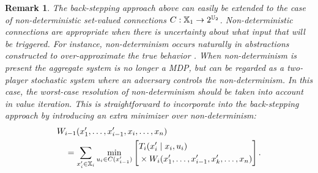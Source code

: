 \documentclass[draft,conference]{IEEEtran}
\newtheorem{remark}{Remark}
\begin{document}


\begin{remark}
	The back-stepping approach above can easily be extended to the case of \emph{non-deterministic} set-valued connections $C : \mathbb{X}_1 \rightarrow 2^{\mathbb{U}_2}$. Non-deterministic connections are appropriate when there is uncertainty about what input that will be triggered. For instance, non-determinism occurs naturally in abstractions constructed to over-approximate the true behavior \cite{Haesaert18}. When non-determinism is present the aggregate system is no longer a MDP, but can be regarded as a two-player stochastic system where an adversary controls the non-determinism. In this case, the worst-case resolution of non-determinism should be taken into account in value iteration. This is straightforward to incorporate into the back-stepping approach by introducing an extra minimizer over non-determinism:
	\begin{equation*}
	\begin{aligned}
	  & W_{i-1}(x_1', \ldots, x_{i-1}', x_i, \ldots, x_n) \\
	  & \quad = \sum_{x_{i}' \in \mathbb{X}_{i}} \min_{u_i \in C(x_{i-1}')} \left[ \begin{aligned} & T_{i} (x_{i}' \mid x_{i}, u_i) \\ 
	   & \times W_{i} (x_1', \ldots, x_{i-1}', x_k', \ldots, x_n)
	    \end{aligned} \right].
	\end{aligned}
	\end{equation*}
\end{remark}


\end{document}
